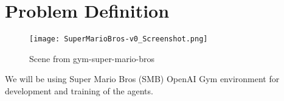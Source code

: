 \section{Problem Definition} %

\begin{figure}[h]
    \centering
    \texttt{[image: SuperMarioBros-v0\_Screenshot.png]}
    \caption{\label{fig:smbv0_screenshot2}Scene from gym-super-mario-bros \citep{kauten2018gymSMB}}
\end{figure}

We will be using  Super Mario Bros (SMB) OpenAI Gym environment for development and training of the agents.\\

